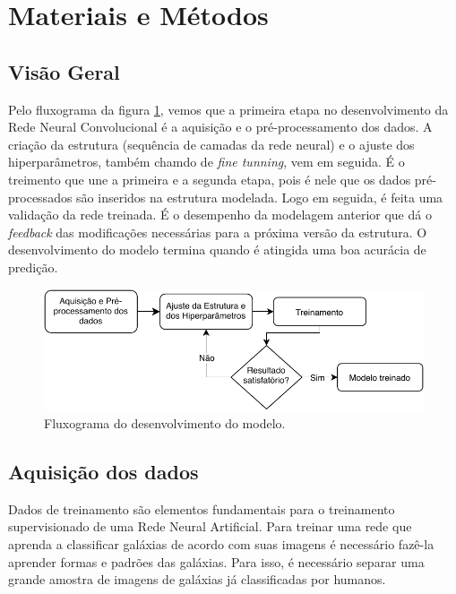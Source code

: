 \section{Materiais e Métodos}

\subsection{Visão Geral}

Pelo fluxograma da figura \ref{fig:fluxogram}, vemos que a primeira etapa no desenvolvimento da Rede Neural Convolucional é a aquisição e o pré-processamento dos dados. A criação da estrutura (sequência de camadas da rede neural) e o ajuste dos hiperparâmetros, também chamdo de \emph{fine tunning}, vem em seguida. É o treimento que une a primeira e a segunda etapa, pois é nele que os dados pré-processados são inseridos na estrutura modelada. Logo em seguida, é feita uma validação da rede treinada. É o desempenho da modelagem anterior que dá o \emph{feedback} das modificações necessárias para a próxima versão da estrutura. O desenvolvimento do modelo termina quando é atingida uma boa acurácia de predição.

\begin{figure}[h!]
  \centering
  \includegraphics[width=\textwidth]{figures/dl_diagram.pdf}
  \caption{Fluxograma do desenvolvimento do modelo.}
  \label{fig:fluxogram}
\end{figure}

\subsection{Aquisição dos dados}

Dados de treinamento são elementos fundamentais para o treinamento supervisionado de uma Rede Neural Artificial. Para treinar uma rede que aprenda a classificar galáxias de acordo com suas imagens é necessário fazê-la aprender formas e padrões das galáxias. Para isso, é necessário separar uma grande amostra de imagens de galáxias já classificadas por humanos.

